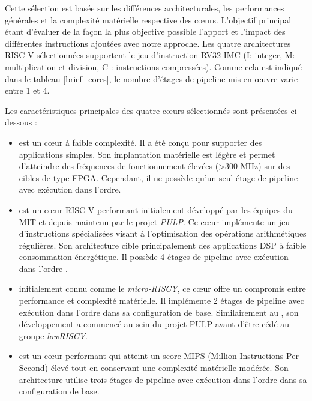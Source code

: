 \documentclass[../main.tex]{subfiles}
\begin{document}
Cette sélection est basée sur les différences architecturales, les performances générales et la complexité matérielle respective des cœurs. L'objectif principal étant d’évaluer de la façon la plus objective possible l'apport et l'impact des différentes instructions ajoutées avec notre approche. 
Les quatre architectures RISC-V sélectionnées supportent le jeu d'instruction RV32-IMC (I: integer, M: multiplication et division, C : instructions compressées). Comme cela est indiqué dans le tableau \ref{brief_cores}, le nombre d'étages de pipeline mis en œuvre varie entre 1 et 4.

Les caractéristiques principales des quatre cœurs sélectionnés sont présentées ci-dessous : 

\begin{itemize}
    \item {\PicoRV \cite{wolf_cliffordwolfpicorv32_2021} est un cœur à faible complexité. Il a été conçu pour supporter des applications simples. Son implantation matérielle est légère et permet d'atteindre des fréquences de fonctionnement élevées (>300 MHz) sur des cibles de type FPGA. Cependant, il ne possède qu'un seul étage de pipeline avec exécution dans l'ordre.}
 
    \item {\RISCY \cite{cite_riscy} est un cœur RISC-V performant initialement développé par les équipes du MIT et depuis maintenu par le projet \textit{PULP}. Ce cœur implémente un jeu d'instructions spécialisées visant à l'optimisation des opérations arithmétiques régulières. Son architecture cible principalement des applications DSP à faible consommation énergétique. Il possède 4 étages de pipeline avec exécution dans l'ordre \cite{cite_riscy_url}.}

    \item {\IBEX \cite{noauthor_lowriscibex_2021, schiavone_slow_2017} initialement connu comme le \textit{micro-RISCY}, ce cœur offre un compromis entre performance et complexité matérielle. Il implémente 2 étages de pipeline avec exécution dans l'ordre dans sa configuration de base. Similairement au \RISCY, son développement a commencé au sein du projet PULP avant d'être cédé au groupe \textit{lowRISCV}.}

    \item {\SCR \cite{noauthor_syntacorescr1_2021} est un cœur performant qui atteint un score MIPS (Million Instructions Per Second) élevé tout en conservant une complexité matérielle modérée. Son architecture utilise trois étages de pipeline avec exécution dans l'ordre dans sa configuration de base.} 


\end{itemize}
\end{document}
